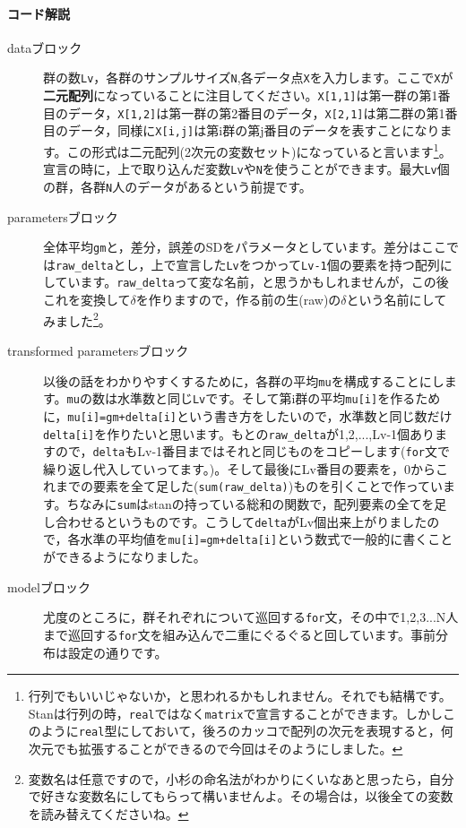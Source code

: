 \documentclass{ltjsbook}
\begin{document}
\paragraph{コード解説}
\begin{description}
    \item[dataブロック] 群の数\verb|Lv|，各群のサンプルサイズ\verb|N|,各データ点\verb|X|を入力します。ここで\verb|X|が\textbf{二元配列}になっていることに注目してください。\verb|X[1,1]|は第一群の第1番目のデータ，\verb|X[1,2]|は第一群の第2番目のデータ，\verb|X[2,1]|は第二群の第1番目のデータ，同様に\verb|X[i,j]|は第i群の第j番目のデータを表すことになります。この形式は二元配列(2次元の変数セット)になっていると言います\footnote{行列でもいいじゃないか，と思われるかもしれません。それでも結構です。Stanは行列の時，\verb|real|ではなく\verb|matrix|で宣言することができます。しかしこのように\verb|real|型にしておいて，後ろのカッコで配列の次元を表現すると，何次元でも拡張することができるので今回はそのようにしました。}。宣言の時に，上で取り込んだ変数\verb|Lv|や\verb|N|を使うことができます。最大\verb|Lv|個の群，各群\verb|N|人のデータがあるという前提です。
    \item[parametersブロック] 全体平均\verb|gm|と，差分，誤差のSDをパラメータとしています。差分はここでは\verb|raw_delta|とし，上で宣言した\verb|Lv|をつかって\verb|Lv-1|個の要素を持つ配列にしています。\verb|raw_delta|って変な名前，と思うかもしれませんが，この後これを変換して$\delta$を作りますので，作る前の生(raw)の$\delta$という名前にしてみました\footnote{変数名は任意ですので，小杉の命名法がわかりにくいなあと思ったら，自分で好きな変数名にしてもらって構いませんよ。その場合は，以後全ての変数を読み替えてくださいね。}。
    \item[transformed parametersブロック] 以後の話をわかりやすくするために，各群の平均\verb|mu|を構成することにします。\verb|mu|の数は水準数と同じ\verb|Lv|です。そして第i群の平均\verb|mu[i]|を作るために，\verb|mu[i]=gm+delta[i]|という書き方をしたいので，水準数と同じ数だけ\verb|delta[i]|を作りたいと思います。もとの\verb|raw_delta|が1,2,...,Lv-1個ありますので，\verb|delta|もLv-1番目まではそれと同じものをコピーします(\verb|for|文で繰り返し代入していってます。)。そして最後にLv番目の要素を，0からこれまでの要素を全て足した(\verb|sum(raw_delta)|)ものを引くことで作っています。ちなみに\verb|sum|はstanの持っている総和の関数で，配列要素の全てを足し合わせるというものです。こうして\verb|delta|がLv個出来上がりましたので，各水準の平均値を\verb|mu[i]=gm+delta[i]|という数式で一般的に書くことができるようになりました。
    \item[modelブロック] 尤度のところに，群それぞれについて巡回する\verb|for|文，その中で1,2,3...N人まで巡回する\verb|for|文を組み込んで二重にぐるぐると回しています。事前分布は設定の通りです。
\end{description}
\end{document}
